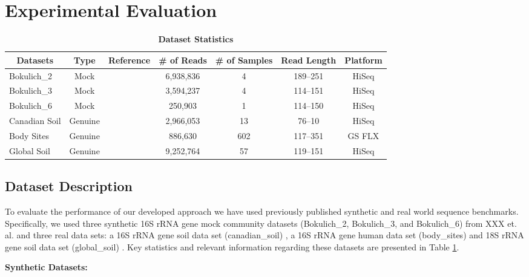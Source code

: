 \documentclass[10pt, conference, compsocconf]{IEEEtran}
\begin{document}
\section{Experimental Evaluation}
\begin{table}[tb] 
\centering 
\caption{\textbf{Dataset Statistics}} \label{table:finaltabledataset} 
\begin{tabular}{|l| c c c c c c|} 
\hline
\multicolumn{1}{|c|}{{\bf{Datasets}}} & \multicolumn{1}{c}{{\bf{Type}}} & {\bf{Reference}} & {\bf{\# of Reads}} & {\bf{\# of Samples}} & {\bf{Read Length}} & {\bf{Platform}}\\
\hline
{Bokulich\_2} & Mock & \cite{MARmockDatasetRef} & 6,938,836 & 4 & 189--251 & HiSeq\\
{Bokulich\_3} & Mock & \cite{MARmockDatasetRef} & 3,594,237 & 4 & 114--151 & HiSeq\\
{Bokulich\_6} & Mock & \cite{MARmockDatasetRef} & 250,903 & 1 & 114--150 & HiSeq\\
{Canadian Soil} & Genuine & \cite{MARcanadianSoil} & 2,966,053 & 13 & 76--10 & HiSeq\\
{Body Sites} & Genuine & \cite{MARbodySites} & 886,630 & 602 & 117--351 & GS FLX\\
{Global Soil} & Genuine & \cite{MARglobalSoil} & 9,252,764 & 57 & 119--151 & HiSeq\\
\hline
\end{tabular}
\end{table} 

\subsection{Dataset Description}


To evaluate the performance of our developed approach 
we have used previously published 
synthetic and real world
sequence benchmarks. 
%
Specifically, 
we used  three synthetic 16S rRNA gene mock 
community datasets (Bokulich\_2, Bokulich\_3, and Bokulich\_6) 
from XXX et. al. \cite{MARmockDatasetRef} and 
three 
real data sets: a 16S rRNA gene soil 
data set (canadian\_soil) \cite{MARcanadianSoil}, a 16S rRNA gene 
human data set (body\_sites) \cite{MARbodySites} and 
18S rRNA gene soil data set (global\_soil) \cite{MARglobalSoil}. 
Key statistics and relevant 
information regarding these datasets are presented
in Table \ref{table:finaltabledataset}. 

\textbf{Synthetic Datasets:}
\end{document}
